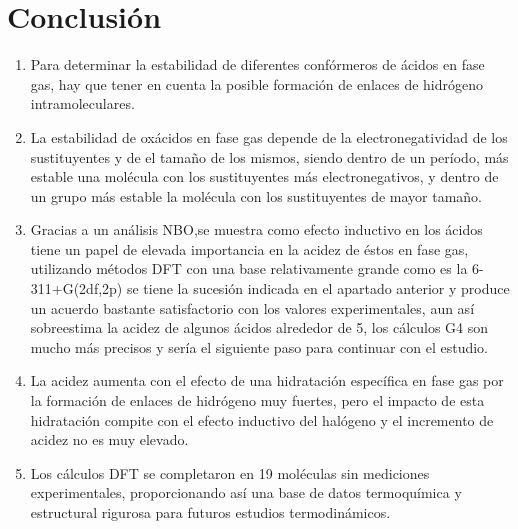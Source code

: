 \chapter{Conclusión}

\begin{enumerate}
	\item Para determinar la estabilidad de diferentes confórmeros de ácidos en fase gas, hay que tener en cuenta la posible formación de enlaces de hidrógeno intramoleculares.
	\item La estabilidad de oxácidos en fase gas depende de la electronegatividad de los sustituyentes y de el tamaño de los mismos, siendo dentro de un período, más estable una molécula con los sustituyentes más electronegativos, y dentro de un grupo más estable la molécula con los sustituyentes de mayor tamaño.
	\item Gracias a un análisis NBO,se muestra como efecto inductivo en los ácidos tiene un papel de elevada importancia en la acidez de éstos en fase gas, utilizando métodos DFT con una base relativamente grande como es la 6-311+G(2df,2p) se tiene la sucesión indicada en el apartado anterior y produce un acuerdo bastante satisfactorio con los valores experimentales, aun así sobreestima la acidez de algunos ácidos alrededor de 5, los cálculos G4 son mucho más precisos y sería el siguiente paso para continuar con el estudio.
	\item La acidez aumenta con el efecto de una hidratación específica en fase gas por la formación de enlaces de hidrógeno muy fuertes, pero el impacto de esta hidratación compite con el efecto inductivo del halógeno y el incremento de acidez no es muy elevado.
	\item Los cálculos DFT se completaron en 19 moléculas sin mediciones experimentales, proporcionando así una base de datos termoquímica y estructural rigurosa para futuros estudios termodinámicos.
	
	
\end{enumerate}